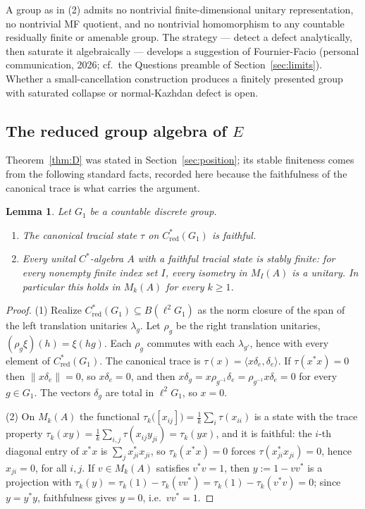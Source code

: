 \documentclass[11pt]{amsart}
\newcommand{\leanverified}[2]{\ignorespaces}
\newtheorem{lemma}[theorem]{Lemma}
\theoremstyle{definition}
\theoremstyle{remark}
\theoremstyle{plain}
\newcommand{\Cred}{C^*_{\mathrm{red}}}
\begin{document}
A group as in (2) admits no nontrivial finite-dimensional unitary
representation, no nontrivial MF quotient, and no nontrivial
homomorphism to any countable residually finite or amenable group.
The strategy --- detect a defect analytically, then saturate it
algebraically --- develops a
suggestion of Fournier-Facio (personal communication, 2026; cf.\ the
Questions preamble of Section~\ref{sec:limits}).  Whether a
small-cancellation construction produces a finitely presented group
with saturated collapse or normal-Kazhdan defect is open.


\subsection{The reduced group algebra of \texorpdfstring{$E$}{E}}

Theorem~\ref{thm:D} was stated in Section~\ref{sec:position}; its stable
finiteness comes from the following standard facts, recorded here because the
faithfulness of the canonical trace is what carries the argument.

\begin{lemma}\label{lem:faithfultrace}
Let $G_1$ be a countable discrete group.
\begin{enumerate}
\item The canonical tracial state $\tau$ on $\Cred(G_1)$ is
faithful.
\item Every unital $C^*$-algebra $A$ with a faithful tracial state
is stably finite: for every nonempty finite index set $I$, every isometry
in $M_I(A)$ is a unitary.  In particular this holds in $M_k(A)$ for every
$k\ge1$.
\leanverified{Sofic/ManuscriptExactWrappers}{GroupApproximation.ManuscriptExactWrappers.manuscriptFaithfulTraceAndStableFiniteness}
\end{enumerate}
\end{lemma}

\begin{proof}
(1) Realize $\Cred(G_1)\subseteq B(\ell^2G_1)$ as the norm closure
of the span of the left translation unitaries $\lambda_g$.  Let
$\rho_g$ be the right translation unitaries,
$(\rho_g\xi)(h)=\xi(hg)$.  Each $\rho_g$ commutes with each
$\lambda_{g'}$, hence with every element of $\Cred(G_1)$.  The
canonical trace is $\tau(x)=\langle x\delta_e,\delta_e\rangle$.  If
$\tau(x^*x)=0$ then $\lVert x\delta_e\rVert=0$, so $x\delta_e=0$,
and then
$x\delta_g=x\rho_{g^{-1}}\delta_e=\rho_{g^{-1}}x\delta_e=0$ for
every $g\in G_1$.  The vectors $\delta_g$ are total in
$\ell^2G_1$, so $x=0$.

(2) On $M_k(A)$ the functional
$\tau_k\bigl([x_{ij}]\bigr)=\tfrac1k\sum_i\tau(x_{ii})$ is a state
with the trace property
$\tau_k(xy)=\tfrac1k\sum_{i,j}\tau(x_{ij}y_{ji})=\tau_k(yx)$, and it
is faithful: the $i$-th diagonal entry of $x^*x$ is
$\sum_jx_{ji}^*x_{ji}$, so $\tau_k(x^*x)=0$ forces
$\tau(x_{ji}^*x_{ji})=0$, hence $x_{ji}=0$, for all $i,j$.  If
$v\in M_k(A)$ satisfies $v^*v=1$, then $y:=1-vv^*$ is a projection
with
$\tau_k(y)=\tau_k(1)-\tau_k(vv^*)=\tau_k(1)-\tau_k(v^*v)=0$; since
$y=y^*y$, faithfulness gives $y=0$, i.e.\ $vv^*=1$.
\end{proof}
\end{document}
